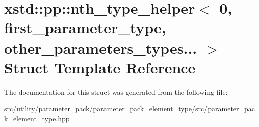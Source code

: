 \hypertarget{structxstd_1_1pp_1_1nth__type__helper_3_010_00_01first__parameter__type_00_01other__parameters__types_8_8_8_01_4}{\section{xstd\-:\-:pp\-:\-:nth\-\_\-type\-\_\-helper$<$ 0, first\-\_\-parameter\-\_\-type, other\-\_\-parameters\-\_\-types... $>$ Struct Template Reference}
\label{structxstd_1_1pp_1_1nth__type__helper_3_010_00_01first__parameter__type_00_01other__parameters__types_8_8_8_01_4}
}


The documentation for this struct was generated from the following file\-:\begin{DoxyCompactItemize}
\item 
src/utility/parameter\-\_\-pack/parameter\-\_\-pack\-\_\-element\-\_\-type/src/parameter\-\_\-pack\-\_\-element\-\_\-type.\-hpp\end{DoxyCompactItemize}

